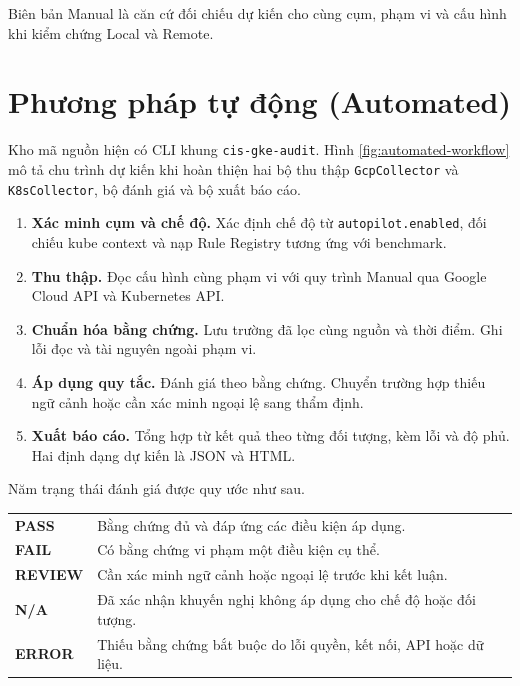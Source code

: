 Biên bản Manual là căn cứ đối chiếu dự kiến cho cùng cụm, phạm vi và cấu hình khi kiểm chứng Local và Remote.

\clearpage
\section{Phương pháp tự động (Automated)}
\label{sec:automated-method}

Kho mã nguồn hiện có CLI khung \texttt{cis-gke-audit}. Hình \ref{fig:automated-workflow} mô tả chu trình dự kiến khi hoàn thiện hai bộ thu thập \texttt{GcpCollector} và \texttt{K8sCollector}, bộ đánh giá và bộ xuất báo cáo.

\begin{center}
  \captionsetup{hypcap=false}
  
  \label{fig:automated-workflow}
\end{center}

\begin{enumerate}[leftmargin=1.0cm,itemsep=0.5pt,parsep=0pt]
  \item \textbf{Xác minh cụm và chế độ.} Xác định chế độ từ \texttt{autopilot.enabled}, đối chiếu kube context và nạp Rule Registry tương ứng với benchmark.
  \item \textbf{Thu thập.} Đọc cấu hình cùng phạm vi với quy trình Manual qua Google Cloud API và Kubernetes API.
  \item \textbf{Chuẩn hóa bằng chứng.} Lưu trường đã lọc cùng nguồn và thời điểm. Ghi lỗi đọc và tài nguyên ngoài phạm vi.
  \item \textbf{Áp dụng quy tắc.} Đánh giá theo bằng chứng. Chuyển trường hợp thiếu ngữ cảnh hoặc cần xác minh ngoại lệ sang thẩm định.
  \item \textbf{Xuất báo cáo.} Tổng hợp từ kết quả theo từng đối tượng, kèm lỗi và độ phủ. Hai định dạng dự kiến là JSON và HTML.
\end{enumerate}

Năm trạng thái đánh giá được quy ước như sau.
\begin{center}
  \small
  \renewcommand{\arraystretch}{1.08}
  \begin{tabularx}{\linewidth}{@{}l >{\raggedright\arraybackslash}X@{}}
    \textbf{PASS} & Bằng chứng đủ và đáp ứng các điều kiện áp dụng. \\
    \textbf{FAIL} & Có bằng chứng vi phạm một điều kiện cụ thể. \\
    \textbf{REVIEW} & Cần xác minh ngữ cảnh hoặc ngoại lệ trước khi kết luận. \\
    \textbf{N/A} & Đã xác nhận khuyến nghị không áp dụng cho chế độ hoặc đối tượng. \\
    \textbf{ERROR} & Thiếu bằng chứng bắt buộc do lỗi quyền, kết nối, API hoặc dữ liệu. \\
  \end{tabularx}
\end{center}

